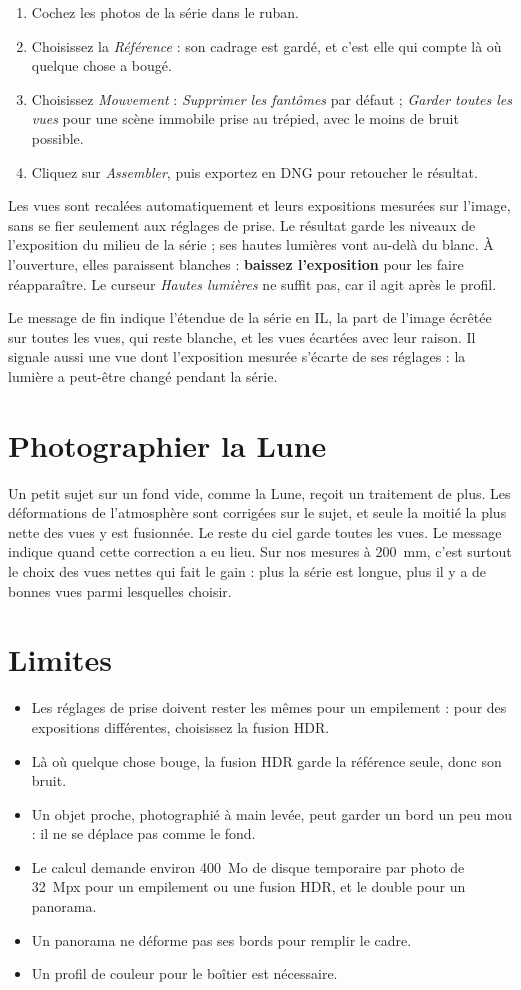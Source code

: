 \begin{enumerate}
\item Cochez les photos de la série dans le ruban.
\item Choisissez la \emph{Référence} : son cadrage est gardé, et c’est elle qui compte là où
quelque chose a bougé.
\item Choisissez \emph{Mouvement} : \emph{Supprimer les fantômes} par défaut ; \emph{Garder
toutes les vues} pour une scène immobile prise au trépied, avec le moins de bruit possible.
\item Cliquez sur \emph{Assembler}, puis exportez en DNG pour retoucher le résultat.
\end{enumerate}

Les vues sont recalées automatiquement et leurs expositions mesurées sur l’image, sans se fier
seulement aux réglages de prise. Le résultat garde les niveaux de l’exposition du milieu de la
série ; ses hautes lumières vont au-delà du blanc. À l’ouverture, elles paraissent blanches :
\textbf{baissez l’exposition} pour les faire réapparaître. Le curseur \emph{Hautes lumières}
ne suffit pas, car il agit après le profil.

Le message de fin indique l’étendue de la série en IL, la part de l’image écrêtée sur toutes
les vues, qui reste blanche, et les vues écartées avec leur raison. Il signale aussi une vue
dont l’exposition mesurée s’écarte de ses réglages : la lumière a peut-être changé pendant la
série.

\section{Photographier la Lune}
Un petit sujet sur un fond vide, comme la Lune, reçoit un traitement de plus. Les
déformations de l’atmosphère sont corrigées sur le sujet, et seule la moitié la plus
nette des vues y est fusionnée. Le reste du ciel garde toutes les vues. Le message
indique quand cette correction a eu lieu. Sur nos mesures à 200~mm, c’est surtout le
choix des vues nettes qui fait le gain : plus la série est longue, plus il y a de bonnes
vues parmi lesquelles choisir.

\section{Limites}
\begin{itemize}
\item Les réglages de prise doivent rester les mêmes pour un empilement : pour des
expositions différentes, choisissez la fusion HDR.
\item Là où quelque chose bouge, la fusion HDR garde la référence seule, donc son bruit.
\item Un objet proche, photographié à main levée, peut garder un bord un peu mou : il
ne se déplace pas comme le fond.
\item Le calcul demande environ 400~Mo de disque temporaire par photo de 32~Mpx pour un
empilement ou une fusion HDR, et le double pour un panorama.
\item Un panorama ne déforme pas ses bords pour remplir le cadre.
\item Un profil de couleur pour le boîtier est nécessaire.
\end{itemize}
